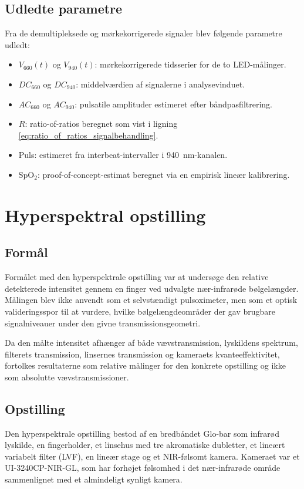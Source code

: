 \subsection{Udledte parametre}
Fra de demultipleksede og mørkekorrigerede signaler blev følgende parametre udledt:
\begin{itemize}
    \item $V_{660}(t)$ og $V_{940}(t)$: mørkekorrigerede tidsserier for de to LED-målinger.
    \item $DC_{660}$ og $DC_{940}$: middelværdien af signalerne i analysevinduet.
    \item $AC_{660}$ og $AC_{940}$: pulsatile amplituder estimeret efter båndpasfiltrering.
    \item $R$: ratio-of-ratios beregnet som vist i ligning \ref{eq:ratio_of_ratios_signalbehandling}.
    \item Puls: estimeret fra interbeat-intervaller i \SI{940}{nm}-kanalen.
    \item SpO$_2$: proof-of-concept-estimat beregnet via en empirisk lineær kalibrering.
\end{itemize}

\section{Hyperspektral opstilling}
\label{sec:hyperspectral_setup}

\subsection{Formål}
Formålet med den hyperspektrale opstilling var at undersøge den relative detekterede intensitet gennem en finger ved udvalgte nær-infrarøde bølgelængder. Målingen blev ikke anvendt som et selvstændigt pulsoximeter, men som et optisk valideringsspor til at vurdere, hvilke bølgelængdeområder der gav brugbare signalniveauer under den givne transmissionsgeometri.

Da den målte intensitet afhænger af både vævstransmission, lyskildens spektrum, filterets transmission, linsernes transmission og kameraets kvanteeffektivitet, fortolkes resultaterne som relative målinger for den konkrete opstilling og ikke som absolutte vævstransmissioner.

\subsection{Opstilling}
Den hyperspektrale opstilling bestod af en bredbåndet Glo-bar som infrarød lyskilde, en fingerholder, et linsehus med tre akromatiske dubletter, et lineært variabelt filter (LVF), en lineær stage og et NIR-følsomt kamera. Kameraet var et UI-3240CP-NIR-GL, som har forhøjet følsomhed i det nær-infrarøde område sammenlignet med et almindeligt synligt kamera.


